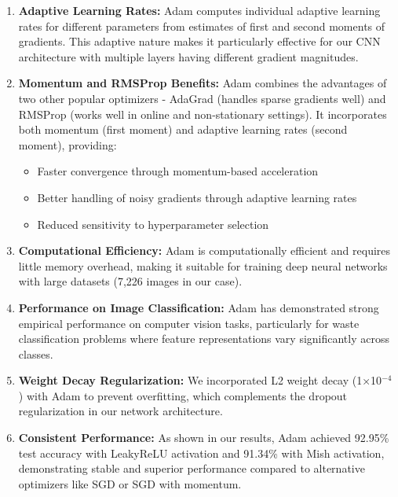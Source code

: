 \documentclass[12pt,a4paper]{article}
\begin{document}
\begin{enumerate}
    \item \textbf{Adaptive Learning Rates:} Adam computes individual adaptive learning rates for different parameters from estimates of first and second moments of gradients. This adaptive nature makes it particularly effective for our CNN architecture with multiple layers having different gradient magnitudes.
    
    \item \textbf{Momentum and RMSProp Benefits:} Adam combines the advantages of two other popular optimizers - AdaGrad (handles sparse gradients well) and RMSProp (works well in online and non-stationary settings). It incorporates both momentum (first moment) and adaptive learning rates (second moment), providing:
    \begin{itemize}
        \item Faster convergence through momentum-based acceleration
        \item Better handling of noisy gradients through adaptive learning rates
        \item Reduced sensitivity to hyperparameter selection
    \end{itemize}
    
    \item \textbf{Computational Efficiency:} Adam is computationally efficient and requires little memory overhead, making it suitable for training deep neural networks with large datasets (7,226 images in our case).
    
    \item \textbf{Performance on Image Classification:} Adam has demonstrated strong empirical performance on computer vision tasks, particularly for waste classification problems where feature representations vary significantly across classes.
    
    \item \textbf{Weight Decay Regularization:} We incorporated L2 weight decay (1×10$^{-4}$) with Adam to prevent overfitting, which complements the dropout regularization in our network architecture.
    
    \item \textbf{Consistent Performance:} As shown in our results, Adam achieved 92.95\% test accuracy with LeakyReLU activation and 91.34\% with Mish activation, demonstrating stable and superior performance compared to alternative optimizers like SGD or SGD with momentum.
\end{enumerate}
\end{document}
